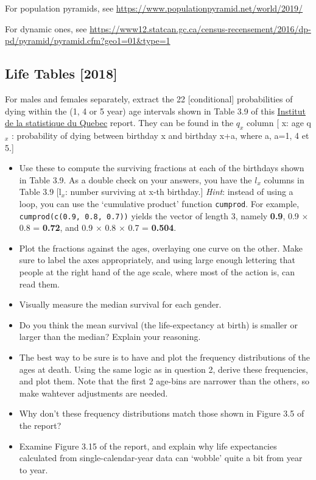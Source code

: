 \documentclass[]{book}
\providecommand{\tightlist}{%
  \setlength{\itemsep}{0pt}\setlength{\parskip}{0pt}}
\begin{document}
For population pyramids, see \url{https://www.populationpyramid.net/world/2019/}

For dynamic ones, see
\url{https://www12.statcan.gc.ca/census-recensement/2016/dp-pd/pyramid/pyramid.cfm?geo1=01\&type=1}

\hypertarget{life-tables-2018}{%
\subsection{Life Tables {[}2018{]}}\label{life-tables-2018}}

For males and females separately, extract the 22 {[}conditional{]} probabilities of dying within the (1, 4 or 5 year) age intervals shown in Table 3.9 of this \href{https://www.stat.gouv.qc.ca/statistiques/population-demographie/bilan2019.pdf\#page=55}{Institut de la statistique du Quebec} report. They can be found in the \(q_x\) column {[} x: age
q\(_x\) : probability of dying between birthday x and birthday x+a, where a, a=1, 4 et 5.{]}

\begin{itemize}
\tightlist
\item
  Use these to compute the surviving fractions at each of the birthdays shown in Table 3.9. As a double check on your answers, you have the \(l_x\) columns in Table 3.9 {[}l\(_x\): number surviving at x-th birthday.{]} \emph{Hint}: instead of using a loop, you can use the `cumulative product' function \texttt{cumprod}. For example, \texttt{cumprod(c(0.9,\ 0.8,\ 0.7))} yields the vector of length 3, namely \textbf{0.9}, 0.9 \(\times\) 0.8 = \textbf{0.72}, and 0.9 \(\times\) 0.8 \(\times\) 0.7 = \textbf{0.504}.
\item
  Plot the fractions against the ages, overlaying one curve on the other. Make sure to label the axes appropriately, and using large enough lettering that people at the right hand of the age scale, where most of the action is, can read them.
\item
  Visually measure the median survival for each gender.
\item
  Do you think the mean survival (the life-expectancy at birth) is smaller or larger than the median? Explain your reasoning.
\item
  The best way to be sure is to have and plot the frequency distributions of the ages at death. Using the same logic as in question 2, derive these frequencies, and plot them. Note that the first 2 age-bins are narrower than the others, so make wahtever adjustments are needed.
\item
  Why don't these frequency distributions match those shown in Figure 3.5 of the report?
\item
  Examine Figure 3.15 of the report, and explain why life expectancies calculated from single-calendar-year data can `wobble' quite a bit from year to year.
\end{itemize}
\end{document}
